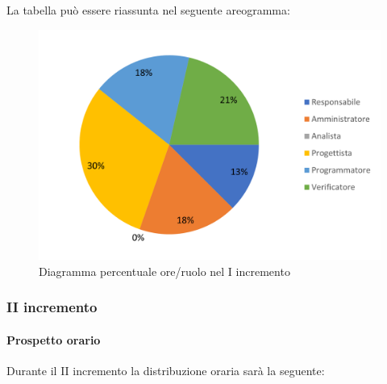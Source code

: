 La tabella può essere riassunta nel seguente areogramma:
\begin{figure}[H]
	\centering
	\includegraphics[width=0.8\linewidth]{res/images/preventivo/dettaglio_poc/1-2.png}
	\caption{Diagramma percentuale ore/ruolo nel I incremento}
	\label{fig:diagramma costi ruolo  I incremento}
\end{figure}

\subsubsection{II incremento}
\paragraph{Prospetto orario}
Durante il II incremento la distribuzione oraria sarà la seguente:

